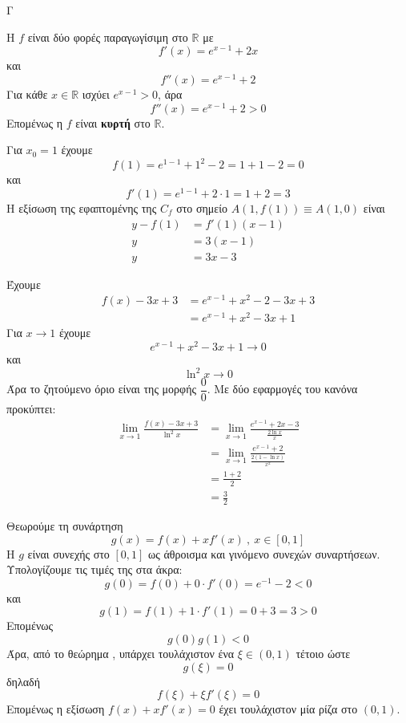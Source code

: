 \begin{thema}{Γ}
\begin{erwthma}
\item Η $f$ είναι δύο φορές παραγωγίσιμη στο $\mathbb{R}$ με
\[f'(x)=e^{x-1}+2x\]
και
\[f''(x)=e^{x-1}+2\]
Για κάθε $x\in\mathbb{R}$ ισχύει $e^{x-1}>0$, άρα
\[f''(x)=e^{x-1}+2>0\]
Επομένως η $f$ είναι \textbf{κυρτή} στο $\mathbb{R}$.

\item Για $x_0=1$ έχουμε
\[f(1)=e^{1-1}+1^2-2=1+1-2=0\]
και
\[f'(1)=e^{1-1}+2\cdot 1=1+2=3\]
Η εξίσωση της εφαπτομένης της $C_f$ στο σημείο $A(1,f(1))\equiv A(1,0)$ είναι
\begin{align*}
y-f(1)&=f'(1)(x-1)\\
y&=3(x-1)\\
y&=3x-3
\end{align*}

\item Έχουμε
\begin{align*}
f(x)-3x+3&=e^{x-1}+x^2-2-3x+3\\
&=e^{x-1}+x^2-3x+1
\end{align*}
Για $x\to 1$ έχουμε
\[e^{x-1}+x^2-3x+1\to 0\]
και
\[\ln^2 x\to 0\]
Άρα το ζητούμενο όριο είναι της μορφής $\dfrac{0}{0}$.
Με δύο εφαρμογές του κανόνα  προκύπτει:
\begin{align*}
\lim\limits_{x\to 1}\frac{f(x)-3x+3}{\ln^2 x}
&=\lim\limits_{x\to 1}\frac{e^{x-1}+2x-3}{\frac{2\ln x}{x}}\\
&=\lim\limits_{x\to 1}\frac{e^{x-1}+2}{\frac{2(1-\ln x)}{x^2}}\\
&=\frac{1+2}{2}\\
&=\frac{3}{2}
\end{align*}

\item Θεωρούμε τη συνάρτηση
\[g(x)=f(x)+xf'(x)\ ,\ x\in[0,1]\]
Η $g$ είναι συνεχής στο $[0,1]$ ως άθροισμα και γινόμενο συνεχών συναρτήσεων.
Υπολογίζουμε τις τιμές της στα άκρα:
\[g(0)=f(0)+0\cdot f'(0)=e^{-1}-2<0\]
και
\[g(1)=f(1)+1\cdot f'(1)=0+3=3>0\]
Επομένως
\[g(0)g(1)<0\]
Άρα, από το θεώρημα , υπάρχει τουλάχιστον ένα $\xi\in(0,1)$ τέτοιο ώστε
\[g(\xi)=0\]
δηλαδή
\[f(\xi)+\xi f'(\xi)=0\]
Επομένως η εξίσωση $f(x)+xf'(x)=0$ έχει τουλάχιστον μία ρίζα στο $(0,1)$.
\end{erwthma}
\end{thema}

